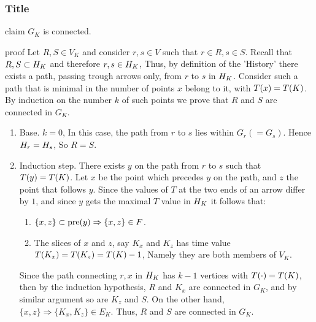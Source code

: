 \documentclass{beamer}
\begin{document}
\begin{frame}
  \frametitle{Title} 

  \begin{block}{claim}
    \label{claim:connected}
    $G_{K}$ is connected. 
  \end{block}


  \begin{block}{proof}
    Let $R, S \in V_{K}$ and consider $r,s \in V$ such that $r \in R, s \in S$. Recall that $R,S \subset H_{K}$ and therefore $r,s \in H_{K}$, Thus, by definition of the 'History' there exists a path, passing trough arrows only, from $r$ to $s$ in $H_{K}$. Consider such a path that is minimal in the number of points $x$ belong to it, with $T(x) = T(K)$. By induction on the number $k$ of such points we prove that $R$ and $S$ are connected in $G_{K}$. 

    \begin{enumerate}
      \item Base. $k=0$, In this case, the path from $r$ to $s$ lies within $G_{r} (= G_{s})$. Hence $H_{r} = H_{s}$, So $R = S$. 
      \item Induction step. There exists $y$ on the path from $r$ to $s$ such that $T(y) = T(K)$. Let $x$ be the point which precedes $y$ on the path, and $z$ the point that follows $y$. Since the values of $T$ at the two ends of an arrow differ by $1$, and since $y$ gets the maximal $T$ value in $H_{K}$ it follows that: 
        \begin{enumerate}
          \item $\{x,z\} \subset \text{pre}(y) \Rightarrow \{x,z\} \in F$. 
          \item The slices of $x$ and $z$, say $K_{x}$ and $K_{z}$ has time value $T(K_{x}) = T(K_{z}) = T(K) -1$, Namely they are both members of $V_{K}$. 
        \end{enumerate}
        Since the path connecting $r,x$ in $H_{K}$ has $k-1$ vertices with $T(\cdot) = T(K)$, then by the induction hypothesis, $R$ and $K_{x}$ are connected in $G_{K}$, and by similar argument so are $K_{z}$ and $S$. On the other hand, $ \{x,z\} \Rightarrow \{K_{x},K_{z}\} \in E_{K}$. Thus, $R$ and $S$ are connected in $G_{K}$.
    \end{enumerate}
  \end{block}

\end{frame}
\end{document}
